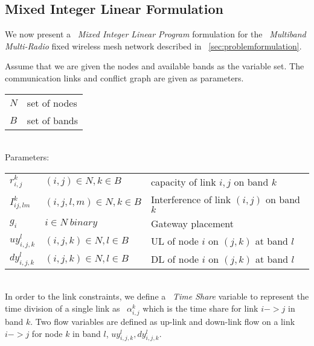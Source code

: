 \subsection{Mixed Integer Linear Formulation}
\label{subsec:linearopt}

We now present a ~\emph{Mixed Integer Linear Program} formulation for the ~\emph{Multiband Multi-Radio} fixed wireless mesh network described in ~\ref{sec:problemformulation}.



Assume that we are given the nodes and available bands as the variable set. The communication links and conflict graph are given as parameters.
\\
\begin{tabular}{ll}
$N$ & set of nodes  \\
$B$ & set of bands  \\
\end{tabular}\\
\vspace{2pt}
Parameters:
\vspace{1pt}

\begin{tabular}{lll}
$r_{i,j}^k$ & $(i,j)\in N, k \in B$ & capacity of link $i,j$ on band $k$\\
$I_{ij,lm}^k$ & $(i,j,l,m) \in N, k\in B $ & Interference of link $(i,j)$ on band $k$\\
$g_i$ & $i \in N\ binary$ &
Gateway placement\\
$uy_{i,j,k}^l$ & $(i,j,k) \in N, l \in B$ & 
 UL of node $i$ on $(j,k)$ at band $l$ \\ 
$dy_{i,j,k}^l$ & $(i,j,k) \in N, l \in B$ & 
DL of node $i$ on $(j,k)$ at band $l$ \\ 
\end{tabular}\\


In order to the link constraints, we define a ~\emph{Time Share} variable to represent the time division of a single link as ~\emph{$\alpha_{i,j}^k$} which is the time share for link $i->j$ in band $k$. 
Two flow variables are defined as up-link and down-link flow on a link $i->j$ for node $k$ in band $l$, $uy_{i,j,k}^l,dy_{i,j,k}^l$.

